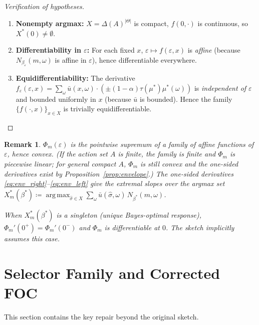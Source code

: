 \documentclass[12pt]{article}
\newtheorem{remark}[theorem]{Remark}
\newcommand{\argmax}{\operatorname{arg\,max}}
\begin{document}
\begin{proof}[Verification of hypotheses]
\leavevmode
\begin{enumerate}
\item \textbf{Nonempty argmax:} $X = \Delta(A)^{|\Theta|}$ is compact, $f(0,\cdot)$ is continuous, so $X^*(0) \neq \emptyset$.
\item \textbf{Differentiability in $\varepsilon$:} For each fixed $x$, $\varepsilon \mapsto f(\varepsilon,x)$ is \emph{affine} (because $N_{\beta_\varepsilon}(m,\omega)$ is affine in $\varepsilon$), hence differentiable everywhere.
\item \textbf{Equidifferentiability:} The derivative $f_\varepsilon(\varepsilon, x) = \sum_\omega \bar{u}(x,\omega) \cdot (\pm(1-\alpha)\tau(\mu^*)\mu^*(\omega))$ is \emph{independent of $\varepsilon$} and bounded uniformly in $x$ (because $\bar{u}$ is bounded). Hence the family $\{f(\cdot, x)\}_{x \in X}$ is trivially equidifferentiable.
\end{enumerate}
\end{proof}

\begin{remark}
$\Phi_m(\varepsilon)$ is the pointwise supremum of a family of affine functions of $\varepsilon$, hence convex. (If the action set $A$ is finite, the family is finite and $\Phi_m$ is piecewise linear; for general compact $A$, $\Phi_m$ is still convex and the one-sided derivatives exist by Proposition~\ref{prop:envelope}.) The one-sided derivatives \eqref{eq:env_right}--\eqref{eq:env_left} give the extremal slopes over the argmax set $X^*_m(\beta^*) \coloneqq \argmax_{\hat\sigma \in X} \sum_\omega \bar{u}(\hat\sigma,\omega)\, N_{\beta^*}(m,\omega)$.

When $X^*_m(\beta^*)$ is a singleton (unique Bayes-optimal response), $\Phi_m'(0^+) = \Phi_m'(0^-)$ and $\Phi_m$ is differentiable at $0$. The sketch implicitly assumes this case.
\end{remark}

\section{Selector Family and Corrected FOC}
\label{sec:selector}

This section contains the key repair beyond the original sketch.
\end{document}
